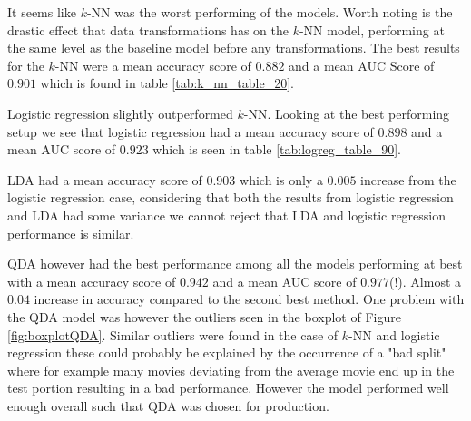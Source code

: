 \documentclass[../../project.tex]{subfiles}
\begin{document}
	It seems like $k$-NN was the worst performing of the models. Worth noting is the drastic effect that data transformations has on the $k$-NN model, performing at the same level as the baseline model before any transformations. The best results for the $k$-NN were a mean accuracy score of $0.882$ and a mean AUC Score of $0.901$ which is found in table \ref{tab:k_nn_table_20}.
	
	Logistic regression slightly outperformed $k$-NN. Looking at the best performing setup we see that logistic regression had a mean accuracy score of $0.898$ and a mean AUC score of $0.923$ which is seen in table \ref{tab:logreg_table_90}.  
	
	LDA had a mean accuracy score of $0.903$ which is only a $0.005$ increase from the logistic regression case, considering that both the results from logistic regression and LDA had some variance we cannot reject that LDA and logistic regression performance is similar.
	
	QDA however had the best performance among all the models performing at best with a mean accuracy score of $0.942$ and a mean AUC score of $0.977$(!). Almost a $0.04$ increase in accuracy compared to the second best method. One problem with the QDA model was however the outliers seen in the boxplot of Figure \ref{fig:boxplotQDA}. Similar outliers were found in the case of $k$-NN and logistic regression these could probably be explained by the occurrence of a "bad split" where for example many movies deviating from the average movie end up in the test portion resulting in a bad performance. However the model performed well enough overall such that QDA was chosen for production.
	
\end{document}
